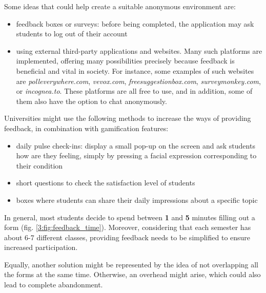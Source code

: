     Some ideas that could help create a suitable anonymous environment are:
    
    \begin{itemize}
            \setlength{\topsep}{0.5pt}
            \setlength{\itemsep}{0.5pt}
            \setlength{\parsep}{0.5pt}
            \item feedback boxes or surveys: before being completed, the application may ask students to log out of their account
            \item using external third-party applications and websites. Many such platforms are implemented, offering many possibilities precisely because feedback is beneficial and vital in society. For instance, some examples of such websites are \textit{polleverywhere.com}, \textit{vevox.com}, \textit{freesuggestionbox.com}, \textit{surveymonkey.com}, or \textit{incognea.to}. These platforms are all free to use, and in addition, some of them also have the option to chat anonymously.
    \end{itemize}
    
    Universities might use the following methods to increase the ways of providing feedback, in combination with gamification features:
    
    \begin{itemize}
            \setlength{\topsep}{0.5pt}
            \setlength{\itemsep}{0.5pt}
            \setlength{\parsep}{0.5pt}
            \item daily pulse check-ins: display a small pop-up on the screen and ask students how are they feeling, simply by pressing a facial expression corresponding to their condition
            \item short questions to check the satisfaction level of students
            \item boxes where students can share their daily impressions about a specific topic
    \end{itemize}
    
    In general, most students decide to spend between \textbf{1} and \textbf{5} minutes filling out a form (fig. \ref{3:fig:feedback_time}). Moreover, considering that each semester has about 6-7 different classes, providing feedback needs to be simplified to ensure increased participation.
    
    Equally, another solution might be represented by the idea of not overlapping all the forms at the same time. Otherwise, an overhead might arise, which could also lead to complete abandonment.
    
